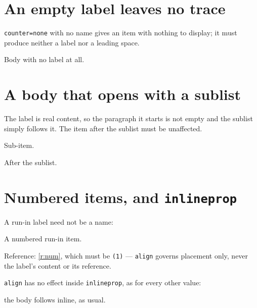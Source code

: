 \documentclass{article}
\begin{document}
\section{An empty label leaves no trace}

\verb|counter=none| with no name gives an item with nothing to display; it must
produce neither a label nor a leading space.

\begin{prop}
  \item[counter=none, align=runin] Body with no label at all.
\end{prop}

\section{A body that opens with a sublist}

The label is real content, so the paragraph it starts is not empty and the
sublist simply follows it.  The item after the sublist must be unaffected.

\begin{prop}
  \item[Outer, align=runin]
  \begin{prop}
    \item Sub-item.
  \end{prop}
  \item[Next, align=runin] After the sublist.
\end{prop}

\section{Numbered items, and \texttt{inlineprop}}

A run-in label need not be a name:

\begin{prop}
  \item[align=runin] A numbered run-in item. \label{r:num}
\end{prop}

Reference: \ref{r:num}, which must be \texttt{(1)} --- \texttt{align} governs
placement only, never the label's content or its reference.

\verb|align| has no effect inside \verb|inlineprop|, as for every other value:
\begin{inlineprop}
  \item[Inline, align=runin] the body follows inline, as usual.
\end{inlineprop}
\end{document}
